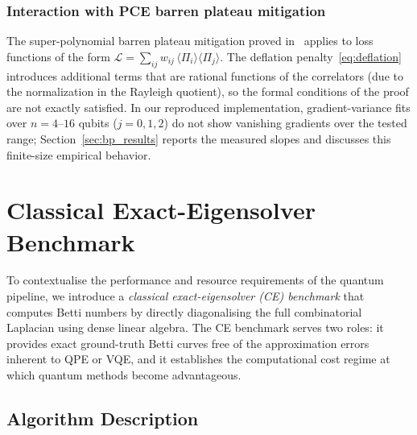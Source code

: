 \documentclass[conference,10pt]{IEEEtran}
\begin{document}
\subsubsection{Interaction with PCE barren plateau mitigation}

The super-polynomial barren plateau mitigation proved
in~\cite{Sciorilli24} applies to loss functions of the form
$\mathcal{L} = \sum_{ij} w_{ij}\, \langle \Pi_i \rangle \langle \Pi_j
\rangle$. The deflation penalty~\eqref{eq:deflation} introduces
additional terms that are rational functions of the correlators (due
to the normalization in the Rayleigh quotient), so the formal
conditions of the proof are not exactly satisfied. In our reproduced
implementation, gradient-variance fits over $n=4$--$16$ qubits
($j=0,1,2$) do not show vanishing gradients over the tested range;
Section~\ref{sec:bp_results} reports the measured slopes and discusses
this finite-size empirical behavior.

\section{Classical Exact-Eigensolver Benchmark}\label{sec:ce}

To contextualise the performance and resource requirements of the
quantum pipeline, we introduce a \emph{classical exact-eigensolver
(CE) benchmark} that computes Betti numbers by directly diagonalising
the full combinatorial Laplacian using dense linear algebra. The CE
benchmark serves two roles: it provides exact ground-truth Betti
curves free of the approximation errors inherent to QPE or VQE, and it
establishes the computational cost regime at which quantum methods
become advantageous.

\subsection{Algorithm Description}
\end{document}
